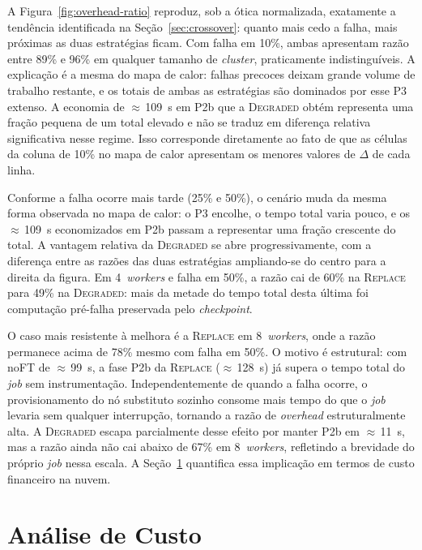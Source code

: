 A Figura~\ref{fig:overhead-ratio} reproduz, sob a ótica normalizada, exatamente a
tendência identificada na Seção~\ref{sec:crossover}: quanto mais cedo a falha, mais
próximas as duas estratégias ficam. Com falha em 10\%, ambas apresentam razão entre
89\% e 96\% em qualquer tamanho de \textit{cluster}, praticamente indistinguíveis. A
explicação é a mesma do mapa de calor: falhas precoces deixam grande volume de
trabalho restante, e os totais de ambas as estratégias são dominados por esse P3
extenso. A economia de $\approx$\,109~s em P2b que a \textsc{Degraded} obtém
representa uma fração pequena de um total elevado e não se traduz em diferença relativa
significativa nesse regime. Isso corresponde diretamente ao fato de que as células da
coluna de 10\% no mapa de calor apresentam os menores valores de $\Delta$ de cada
linha.

Conforme a falha ocorre mais tarde (25\% e 50\%), o cenário muda da mesma forma
observada no mapa de calor: o P3 encolhe, o tempo total varia pouco, e os
$\approx$\,109~s economizados em P2b passam a representar uma fração crescente do
total. A vantagem relativa da \textsc{Degraded} se abre progressivamente, com a
diferença entre as razões das duas estratégias ampliando-se do centro para a direita
da figura. Em 4~\textit{workers} e falha em 50\%, a razão cai de 60\% na
\textsc{Replace} para 49\% na \textsc{Degraded}: mais da metade do tempo total desta
última foi computação pré-falha preservada pelo \textit{checkpoint}.

O caso mais resistente à melhora é a \textsc{Replace} em 8~\textit{workers}, onde a
razão permanece acima de 78\% mesmo com falha em 50\%. O motivo é estrutural: com
noFT de $\approx$\,99~s, a fase P2b da \textsc{Replace} ($\approx$\,128~s) já
supera o tempo total do \textit{job} sem instrumentação. Independentemente de quando a falha
ocorre, o provisionamento do nó substituto sozinho consome mais tempo do que o
\textit{job} levaria sem qualquer interrupção, tornando a razão de \textit{overhead}
estruturalmente alta. A \textsc{Degraded} escapa parcialmente desse efeito por manter
P2b em $\approx$\,11~s, mas a razão ainda não cai abaixo de 67\% em
8~\textit{workers}, refletindo a brevidade do próprio \textit{job} nessa escala. A
Seção~\ref{sec:custo} quantifica essa implicação em termos de custo financeiro na
nuvem.


\section{Análise de Custo}
\label{sec:custo}

